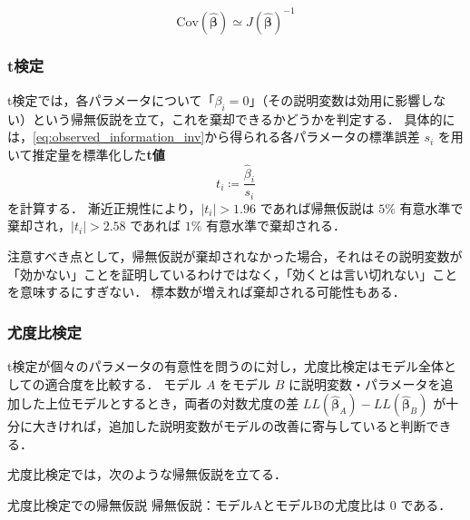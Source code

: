 \begin{equation}
    \label{eq:observed_information_inv}
    \mathrm{Cov}(\bm{\hat\beta}) \simeq J(\bm{\hat\beta})^{-1}
\end{equation}

\subsubsection{t検定}\label{ssec:interval_est}
t検定では，各パラメータについて「$\beta_i = 0$」（その説明変数は効用に影響しない）という帰無仮説を立て，これを棄却できるかどうかを判定する．
具体的には，\eqref{eq:observed_information_inv}から得られる各パラメータの標準誤差 $s_i$ を用いて推定量を標準化した\textbf{t値}
\begin{equation}
    t_i \coloneq \frac{\hat\beta_i}{s_i}
\end{equation}
を計算する．
漸近正規性により，$|t_i| > 1.96$ であれば帰無仮説は $5\%$ 有意水準で棄却され，$|t_i| > 2.58$ であれば $1\%$ 有意水準で棄却される．

注意すべき点として，帰無仮説が棄却されなかった場合，それはその説明変数が「効かない」ことを証明しているわけではなく，「効くとは言い切れない」ことを意味するにすぎない．
標本数が増えれば棄却される可能性もある．

\subsubsection{尤度比検定}\label{sec:likelihood_ratio}
t検定が個々のパラメータの有意性を問うのに対し，尤度比検定はモデル全体としての適合度を比較する．
モデル $A$ をモデル $B$ に説明変数・パラメータを追加した上位モデルとするとき，両者の対数尤度の差 $LL(\hat{\bm\beta}_A) - LL(\hat{\bm\beta}_B)$ が十分に大きければ，追加した説明変数がモデルの改善に寄与していると判断できる．

尤度比検定では，次のような帰無仮説を立てる．

\begin{itembox}[l]{尤度比検定での帰無仮説}
    帰無仮説：モデルAとモデルBの尤度比は $0$ である．
\end{itembox}

